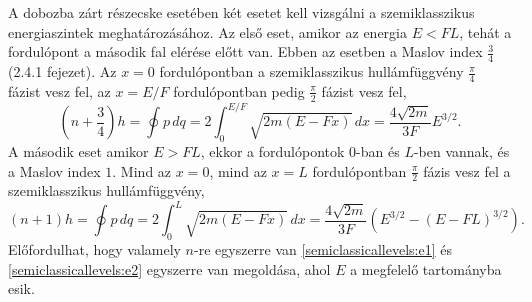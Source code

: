 A dobozba zárt részecske esetében két esetet kell vizsgálni a szemiklasszikus energiaszintek meghatározásához. Az első eset, amikor az energia $E < FL$, tehát a fordulópont a második fal elérése előtt van. Ebben az esetben a Maslov index $\frac{3}{4}$ \cite{brack:semiclassical} (2.4.1 fejezet). Az $x=0$ fordulópontban a szemiklasszikus hullámfüggvény $\frac{\pi}{4}$ fázist vesz fel, az $x=E/F$ fordulópontban pedig $\frac{\pi}{2}$ fázist vesz fel,
\begin{equation}
	\left(n+\frac{3}{4}\right)h=\oint p\,dq=2\int_0^{E/F}\sqrt{2m\left( E-Fx \right)}\,dx=\frac{4\sqrt{2m}}{3F}E^{3/2}.
	\label{semiclassicallevels:e1}
\end{equation}
A második eset amikor $E > FL$, ekkor a fordulópontok $0$-ban és $L$-ben vannak, és a Maslov index $1$. Mind az $x=0$, mind az $x=L$ fordulópontban $\frac{\pi}{2}$ fázis vesz fel a szemiklasszikus hullámfüggvény,
\begin{equation}
	\left(n+1\right)h=\oint p\,dq=2\int_0^{L}\sqrt{2m\left(E-Fx\right)}\,dx=\frac{4\sqrt{2m}}{3F}\left(E^{3/2}-\left(E-FL\right)^{3/2}\right).
	\label{semiclassicallevels:e2}
\end{equation}
Előfordulhat, hogy valamely $n$-re egyszerre van \eqref{semiclassicallevels:e1} és \eqref{semiclassicallevels:e2} egyszerre van megoldása, ahol $E$ a megfelelő tartományba esik.